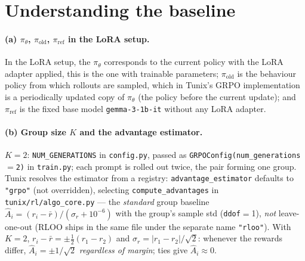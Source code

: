 \documentclass[11pt,a4paper]{article}
\begin{document}
\section{Understanding the baseline}
\label{sec:understand}

\paragraph{(a) $\pi_\theta$, $\pi_{\mathrm{old}}$, $\pi_{\mathrm{ref}}$ in the LoRA setup.}
In the LoRA setup, the $\pi_\theta$ corresponds to the current policy with the LoRA adapter applied, this is the one with trainable parameters; 
$\pi_{\mathrm{old}}$ is the behaviour policy from which rollouts are sampled, which in Tunix's GRPO implementation is a periodically updated copy of $\pi_\theta$ (the policy before the current update);
and $\pi_{\mathrm{ref}}$ is the fixed base model \texttt{gemma-3-1b-it} without any LoRA adapter.

\paragraph{(b) Group size $K$ and the advantage estimator.}
$K=2$: \texttt{NUM\_GENERATIONS} in \texttt{config.py}, passed as
\texttt{GRPOConfig(num\_generations$=$2)} in \texttt{train.py}; each prompt is rolled out
twice, the pair forming one group. Tunix resolves the estimator from a registry:
\texttt{advantage\_estimator} defaults to \texttt{"grpo"} (not overridden), selecting
\texttt{compute\_advantages} in \texttt{tunix/rl/algo\_core.py} --- the \emph{standard}
group baseline $\hat A_i=(r_i-\bar r)/(\sigma_r+10^{-6})$ with the group's sample std
(\texttt{ddof}$=$1), \emph{not} leave-one-out (RLOO ships in the same file under the
separate name \texttt{"rloo"}). With $K{=}2$, $r_i-\bar r=\pm\tfrac12(r_1-r_2)$ and
$\sigma_r=|r_1-r_2|/\sqrt2$: whenever the rewards differ, $\hat A_i=\pm1/\sqrt2$
\emph{regardless of margin}; ties give $\hat A_i\approx0$.
\end{document}
